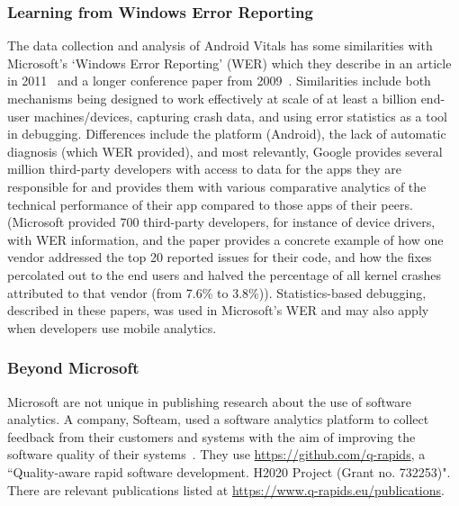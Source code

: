\subsubsection{Learning from Windows Error Reporting}
The data collection and analysis of Android Vitals has some similarities with Microsoft's `Windows Error Reporting' (WER) which they describe in an article in 2011~\cite{kinshuman2011_debugging_in_the_very_large} and a longer conference paper from 2009~\cite{kinshuman2009_debugging_in_the_very_large}. Similarities include both mechanisms being designed to work effectively at scale of at least a billion end-user machines/devices, capturing crash data, and using error statistics as a tool in debugging. Differences include the platform (Android), the lack of automatic diagnosis (which WER provided), and most relevantly, Google provides several million third-party developers with access to data for the apps they are responsible for and provides them with various comparative analytics of the technical performance of their app compared to those apps of their peers. (Microsoft provided 700 third-party developers, for instance of device drivers, with WER information, and the paper provides a concrete example of how one vendor addressed the top 20 reported issues for their code, and how the fixes percolated out to the end users and halved the percentage of all kernel crashes attributed to that vendor (from 7.6\% to 3.8\%)). Statistics-based debugging, described in these papers, was used in Microsoft's WER and may also apply when developers use mobile analytics.

\subsubsection{Beyond Microsoft}
Microsoft are not unique in publishing research about the use of software analytics. A company, Softeam, used a software analytics platform to collect feedback from their customers and systems with the aim of improving the software quality of their systems~\cite{bagnato2020_challenges_and_benefits_from_using_software_analytics_in_softeam}. They use \url{https://github.com/q-rapids}, a ``Quality-aware rapid software development. H2020 Project (Grant no. 732253)". There are relevant publications listed at \url{https://www.q-rapids.eu/publications}.

